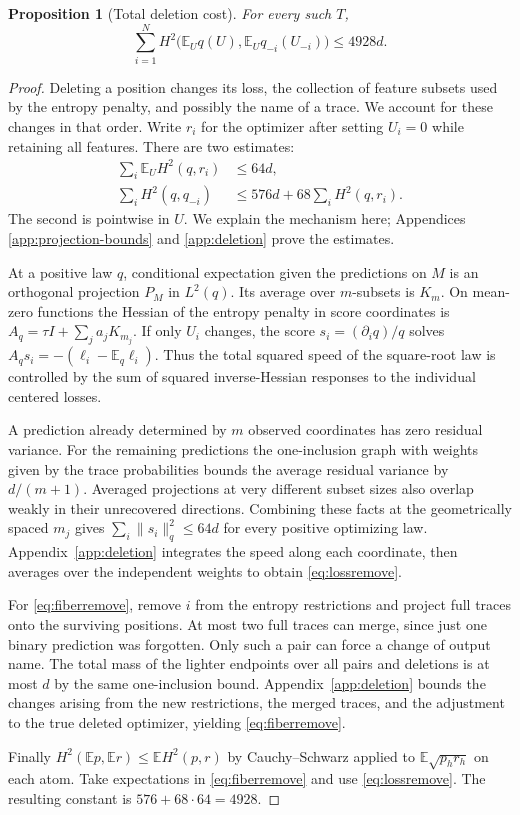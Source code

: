 \documentclass[11pt]{article}
\newtheorem{proposition}[theorem]{Proposition}
\theoremstyle{definition}\newtheorem{definition}[theorem]{Definition}
\newcommand{\E}{\mathbb E}
\begin{document}
\begin{proposition}[Total deletion cost]\label{prop:deletion}
For every such $T$,
\[
 \sum_{i=1}^N H^2\bigl(\E_U q(U),\E_U q_{-i}(U_{-i})\bigr)\le4928d.
\]
\end{proposition}
\begin{proof}
Deleting a position changes its loss, the collection of feature subsets
used by the entropy penalty, and possibly the name of a trace. We account for
these changes in that order. Write $r_i$ for the optimizer after setting
$U_i=0$ while retaining all features. There are two estimates:
\begin{align}
 \sum_i\E_U H^2(q,r_i)&\le64d, \label{eq:lossremove}\\
 \sum_i H^2(q,q_{-i})&\le576d+68\sum_i H^2(q,r_i).
 \label{eq:fiberremove}
\end{align}
The second is pointwise in $U$. We explain the mechanism here; Appendices
\ref{app:projection-bounds} and \ref{app:deletion} prove the estimates.

At a positive law $q$, conditional expectation given the predictions on $M$
is an orthogonal projection $P_M$ in $L^2(q)$. Its average over $m$-subsets is
$K_m$. On mean-zero functions the Hessian of the entropy penalty in score
coordinates is $A_q=\tau I+\sum_j a_j K_{m_j}$. If only $U_i$ changes, the
score $s_i=(\partial_i q)/q$ solves
$A_qs_i=-(\ell_i-\E_q\ell_i)$. Thus the total squared speed of the
square-root law is controlled by the sum of squared inverse-Hessian
responses to the individual centered losses.

A prediction already determined by $m$ observed
coordinates has zero residual variance. For the remaining predictions the
one-inclusion graph \cite{hlw} with weights given by the trace probabilities
bounds the average residual variance by
$d/(m+1)$. Averaged projections at very different subset sizes also overlap
weakly in their unrecovered directions. Combining these facts at the
geometrically spaced $m_j$ gives $\sum_i\|s_i\|_q^2\le64d$ for every
positive optimizing law. Appendix~\ref{app:deletion} integrates the speed
along each coordinate, then averages over the independent weights to obtain
\eqref{eq:lossremove}.

For \eqref{eq:fiberremove}, remove $i$ from the entropy restrictions and
project full traces onto the surviving positions. At most two full traces
can merge, since just one binary prediction was forgotten. Only such a pair
can force a change of output name. The total mass of the lighter endpoints
over all pairs and deletions is at most $d$ by the same one-inclusion bound.
Appendix~\ref{app:deletion} bounds the changes arising from the new restrictions, the merged traces, and
the adjustment to the true deleted optimizer, yielding \eqref{eq:fiberremove}.

Finally $H^2(\E p,\E r)\le\E H^2(p,r)$ by Cauchy--Schwarz applied to
$\E\sqrt{p_h r_h}$ on each atom. Take expectations in
\eqref{eq:fiberremove} and use \eqref{eq:lossremove}. The resulting
constant is $576+68\cdot64=4928$.
\end{proof}
\end{document}

